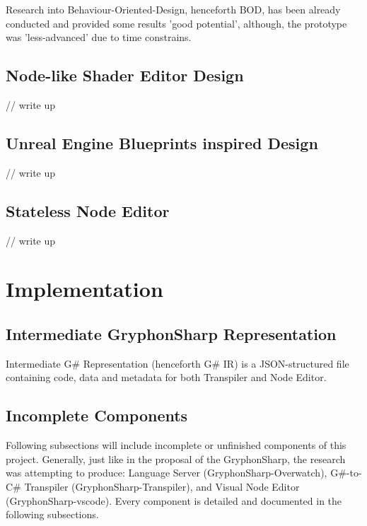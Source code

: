 \documentclass{article}
\begin{document}
Research into Behaviour-Oriented-Design, henceforth BOD, \cite{d2857949266349429ebd6e5db6c1d3a3} has been already conducted and provided some results 'good potential', although, the prototype was 'less-advanced' due to time constrains.

\subsection{Node-like Shader Editor Design}
// write up\cite{kiper_1997_criteria, coronado_2020_visual}
\subsection{Unreal Engine Blueprints inspired Design}
// write up
\subsection{Stateless Node Editor}
// write up\cite{8120404}




\section{Implementation}
\subsection{Intermediate GryphonSharp Representation}
Intermediate G\# Representation (henceforth G\# IR) is a JSON-structured file containing code, data and metadata for both Transpiler and Node Editor.


\subsection{Incomplete Components}
Following subsections will include incomplete or unfinished components of this project. Generally, just like in the proposal of the GryphonSharp, the research was attempting to produce: Language Server (GryphonSharp-Overwatch), G\#-to-C\# Transpiler (GryphonSharp-Transpiler), and Visual Node Editor (GryphonSharp-vscode).
Every component is detailed and documented in the following subsections.
\end{document}
